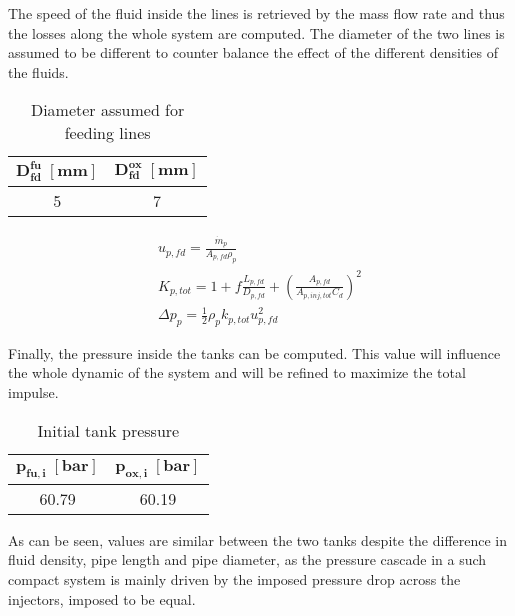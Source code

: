 The speed of the fluid inside the lines is retrieved by the mass flow rate and thus the losses along the whole system are computed. The diameter of the two lines is assumed to be different to counter balance the effect of the different densities of the fluids.

\begin{table}[H]
    \renewcommand{\arraystretch}{1.5}
    \centering
    \begin{tabular}{|c|c|}
        \hline
        $\boldsymbol{D_{fd}^{fu} \; [\textbf{mm}]}$ & $\boldsymbol{D_{fd}^{ ox} \; [\textbf{mm}]}$ \\
        \hline
        \hline
        5 & 7 \\
        \hline
    \end{tabular}
    \caption{Diameter assumed for feeding lines}
    \label{table:diameter_fd}
\end{table}
\vspace{-1cm}
\begin{gather}
         u_{p,fd} = \frac{\dot{m}_p}{A_{p, fd}\rho_p}
        \label{eq:speed}
        \\
        K_{p, tot} = 1 + f \frac{L_{p,fd}}{D_{p,fd}} + \left(\frac{A_{p, fd}}{A_{p,inj, tot}C_d}\right)^2
       \label{eq:feeding_losses}
       \\
       \Delta p_{p} = \frac{1}{2}\rho_p k_{p, tot} u_{p,fd}^2 
       \label{eq:dp_tot}
\end{gather}

Finally, the pressure inside the tanks can be computed. This value will influence the whole dynamic of the system and will be refined to maximize the total impulse.

\begin{table}[H]
    \renewcommand{\arraystretch}{1.5}
    \centering
    \begin{tabular}{|c|c|}
        \hline
        $\boldsymbol{p_{fu,i}} \; [\textbf{bar}]$ & $\boldsymbol{p_{ox,i}\; [\textbf{bar}]}$ \\
        \hline
        \hline
        60.79 & 60.19 \\
        \hline
    \end{tabular}
    \caption{Initial tank pressure}
    \label{table:tk_press}
\end{table}
As can be seen, values are similar between the two tanks despite the difference in fluid density, pipe length and pipe diameter, as the pressure cascade in a such compact system is mainly driven by the imposed pressure drop across the injectors, imposed to be equal.

